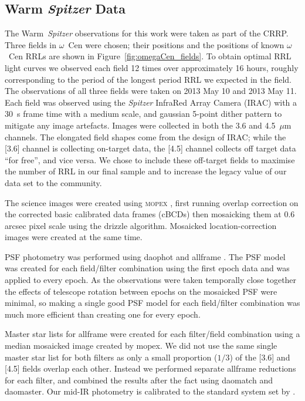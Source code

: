 \documentclass[a4paper,fleqn,usenatbib]{mnras}
\begin{document}
\subsection{Warm {\em Spitzer} Data}
\label{sec:spitzer_reduction}
The Warm~\textit{Spitzer} observations for this work were taken as part of the CRRP. Three fields in $\omega$~Cen were chosen; their positions and the positions of known $\omega$~Cen RRLs are shown in Figure~\ref{fig:omegaCen_fields}. To obtain optimal RRL light curves we observed each field 12 times over approximately 16 hours, roughly corresponding to the period of the longest period RRL we expected in the field. The observations of all three fields were taken on 2013 May 10 and 2013 May 11. Each field was observed using the {\it Spitzer} InfraRed Array Camera (IRAC) \citep{2004ApJS..154...10F} with a 30~s frame time with a medium scale, and gaussian 5-point dither pattern to mitigate any image artefacts. Images were collected in both the 3.6 and 4.5~$\mu$m channels. 
The elongated field shapes come from the design of IRAC; while the [3.6] channel is collecting on-target data, the [4.5] channel collects off target data ``for free'', and vice versa. We chose to include these off-target fields to maximise the number of RRL in our final sample and to increase the legacy value of our data set to the community. 

The science images were created using \textsc{mopex} \citep{2006SPIE.6274E..0CM}, first running overlap correction on the corrected basic calibrated data frames (cBCDs) then mosaicking them at 0.6 arcsec pixel scale using the drizzle algorithm. Mosaicked location-correction images were created at the same time. 

PSF photometry was performed using {\sc daophot} and {\sc allframe} \citep{1987PASP...99..191S, 1994PASP..106..250S}. The PSF model was created for each field/filter combination using the first epoch data and was applied to every epoch. As the observations were taken temporally close together the effects of telescope rotation between epochs on the mosaicked PSF were minimal, so making a single good PSF model for each field/filter combination was much more efficient than creating one for every epoch. 

Master star lists for {\sc allframe} were created for each filter/field combination using a median mosaicked image created by {\sc mopex}. We did not use the same single master star list for both filters as only a small proportion ($1/3$) of the [3.6] and [4.5] fields overlap each other. Instead we performed separate {\sc allframe} reductions for each filter, and combined the results after the fact using {\sc daomatch} and {\sc daomaster}. Our mid-IR photometry is calibrated to the standard system set by \citet{2005PASP..117..978R}.
\end{document}

